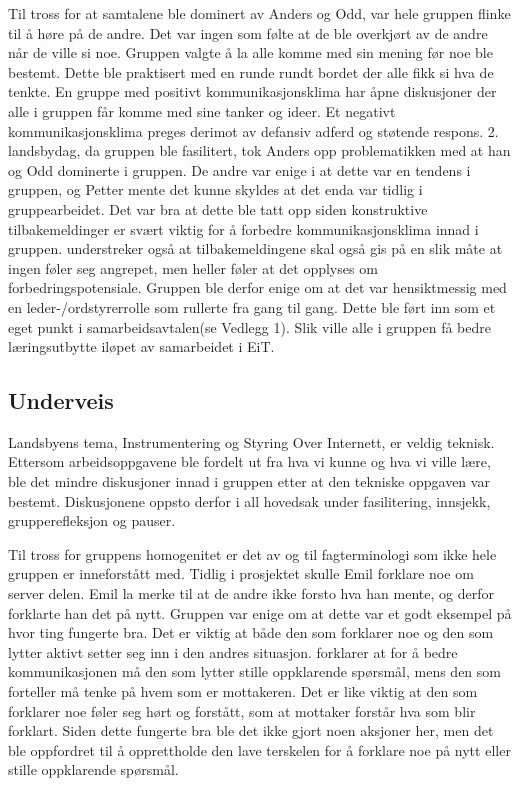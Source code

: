 Til tross for at samtalene ble dominert av Anders og Odd, var hele gruppen flinke til å høre på de andre. 
Det var ingen som følte at de ble overkjørt av de andre når de ville si noe. 
Gruppen valgte å la alle komme med sin mening før noe ble bestemt. 
Dette ble praktisert med en runde rundt bordet der alle fikk si hva de tenkte. 
En gruppe med positivt kommunikasjonsklima har åpne diskusjoner der alle i gruppen får komme med sine tanker og ideer\citep{levin}. 
Et negativt kommunikasjonsklima preges derimot av defansiv adferd og støtende respons. 
2. landsbydag, da gruppen ble fasilitert, tok Anders opp problematikken med at han og Odd dominerte i gruppen. 
De andre var enige i at dette var en tendens i gruppen, og Petter mente det kunne skyldes at det enda var tidlig i gruppearbeidet. 
Det var bra at dette ble tatt opp siden konstruktive tilbakemeldinger er svært viktig for å forbedre kommunikasjonsklima innad i gruppen.
\citet{levin} understreker også at tilbakemeldingene skal også gis på en slik måte at ingen føler seg angrepet, men heller føler at det opplyses om forbedringspotensiale.
Gruppen ble derfor enige om at det var hensiktmessig med en leder-/ordstyrerrolle som rullerte fra gang til gang.
Dette ble ført inn som et eget punkt i samarbeidsavtalen(se Vedlegg 1). 
Slik ville alle i gruppen få bedre læringsutbytte iløpet av samarbeidet i EiT. 
\vspace{\secspace}

\subsection{Underveis}
Landsbyens tema, Instrumentering og Styring Over Internett, er veldig teknisk. 
Ettersom arbeidsoppgavene ble fordelt ut fra hva vi kunne og hva vi ville lære, ble det mindre diskusjoner innad i gruppen etter at den tekniske oppgaven var bestemt. 
Diskusjonene oppsto derfor i all hovedsak under fasilitering, innsjekk, grupperefleksjon og pauser. 
\vspace{\secspace}

Til tross for gruppens homogenitet er det av og til fagterminologi som ikke hele gruppen er inneforstått med.  
Tidlig i prosjektet skulle Emil forklare noe om server delen. 
Emil la merke til at de andre ikke forsto hva han mente, og derfor forklarte han det på nytt. 
Gruppen var enige om at dette var et godt eksempel på hvor ting fungerte bra. 
Det er viktig at både den som forklarer noe og den som lytter aktivt setter seg inn i den andres situasjon.
\citet{levin} forklarer at for å bedre kommunikasjonen må den som lytter stille oppklarende spørsmål, mens den som forteller må tenke på hvem som er mottakeren. 
Det er like viktig at den som forklarer noe føler seg hørt og forstått, som at mottaker forstår hva som blir forklart. 
Siden dette fungerte bra ble det ikke gjort noen aksjoner her, men det ble oppfordret til å opprettholde den lave terskelen for å forklare noe på nytt eller stille oppklarende spørsmål.
\vspace{\secspace}

